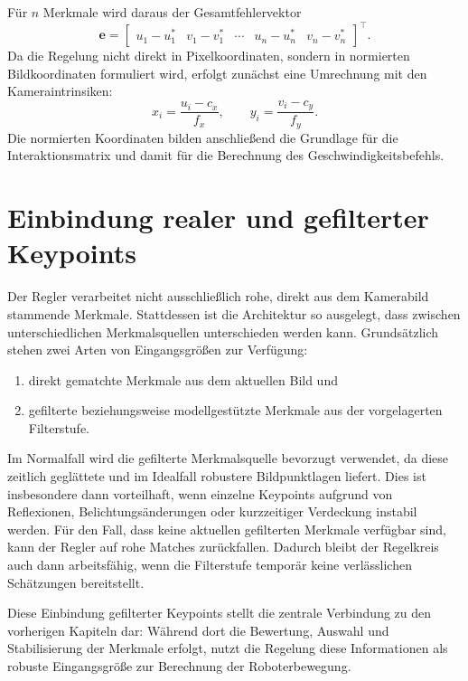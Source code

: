 Für \(n\) Merkmale wird daraus der Gesamtfehlervektor
\begin{equation}
\mathbf{e} =
\begin{bmatrix}
u_1-u_1^\ast &
v_1-v_1^\ast &
\cdots &
u_n-u_n^\ast &
v_n-v_n^\ast
\end{bmatrix}^{\top}.
\end{equation}
Da die Regelung nicht direkt in Pixelkoordinaten, sondern in normierten Bildkoordinaten formuliert wird, erfolgt zunächst eine Umrechnung mit den Kameraintrinsiken:
\begin{equation}
x_i = \frac{u_i-c_x}{f_x},
\qquad
y_i = \frac{v_i-c_y}{f_y}.
\end{equation}
Die normierten Koordinaten bilden anschließend die Grundlage für die Interaktionsmatrix und damit für die Berechnung des Geschwindigkeitsbefehls.

\section{Einbindung realer und gefilterter Keypoints}
\label{sec:einbindung_keypoints}

Der Regler verarbeitet nicht ausschließlich rohe, direkt aus dem Kamerabild stammende Merkmale. Stattdessen ist die Architektur so ausgelegt, dass zwischen unterschiedlichen Merkmalsquellen unterschieden werden kann. Grundsätzlich stehen zwei Arten von Eingangsgrößen zur Verfügung:

\begin{enumerate}
    \item direkt gematchte Merkmale aus dem aktuellen Bild und
    \item gefilterte beziehungsweise modellgestützte Merkmale aus der vorgelagerten Filterstufe.
\end{enumerate}

Im Normalfall wird die gefilterte Merkmalsquelle bevorzugt verwendet, da diese zeitlich geglättete und im Idealfall robustere Bildpunktlagen liefert. Dies ist insbesondere dann vorteilhaft, wenn einzelne Keypoints aufgrund von Reflexionen, Belichtungsänderungen oder kurzzeitiger Verdeckung instabil werden. Für den Fall, dass keine aktuellen gefilterten Merkmale verfügbar sind, kann der Regler auf rohe Matches zurückfallen. Dadurch bleibt der Regelkreis auch dann arbeitsfähig, wenn die Filterstufe temporär keine verlässlichen Schätzungen bereitstellt.

Diese Einbindung gefilterter Keypoints stellt die zentrale Verbindung zu den vorherigen Kapiteln dar: Während dort die Bewertung, Auswahl und Stabilisierung der Merkmale erfolgt, nutzt die Regelung diese Informationen als robuste Eingangsgröße zur Berechnung der Roboterbewegung.


